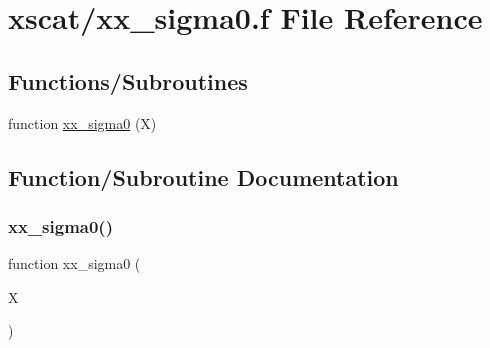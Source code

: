 \hypertarget{xx__sigma0_8f}{}\section{xscat/xx\+\_\+sigma0.f File Reference}
\label{xx__sigma0_8f}
\subsection*{Functions/\+Subroutines}
\begin{DoxyCompactItemize}
\item 
function \hyperlink{xx__sigma0_8f_af58ee554560cda43153d69cb77f94392}{xx\+\_\+sigma0} (X)
\end{DoxyCompactItemize}


\subsection{Function/\+Subroutine Documentation}
\mbox{\label{xx__sigma0_8f_af58ee554560cda43153d69cb77f94392}} 
\subsubsection{\texorpdfstring{xx\+\_\+sigma0()}{xx\_sigma0()}}
{\footnotesize\ttfamily function xx\+\_\+sigma0 (\begin{DoxyParamCaption}\item[{}]{X }\end{DoxyParamCaption})}


